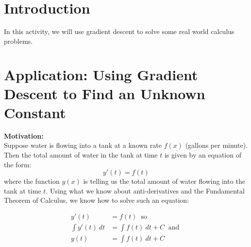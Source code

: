\documentclass[11pt]{article}
\begin{document}
\begin{minipage}[c]{0.63\textwidth}
\begin{center}
\end{center}
\end{minipage}
\newpage


















\newpage
\section*{Introduction}

In this activity, we will use gradient descent to solve some real world calculus problems.
\section*{Application: Using Gradient Descent to Find an Unknown Constant}

\textbf{Motivation:} \\
Suppose water is flowing into a tank at a known rate $f(x)$ (gallons per minute). Then the total amount of water in the tank at time $t$ is given by an equation of the form:
\[
y'(t) = f(t)
\]
where the function $y(x)$ is telling us the  total amount of water flowing into the tank at time $t$. Using what we know about anti-derivatives and the Fundamental Theorem of Calculus, we know how to solve such an equation:

\begin{align*}
y'(t) &= f(t) \ \text{ so}\\
\int y'(t) \ dt  &= \int f(t) \ dt + C \  \text{ and }\\
y(t) &= \int f(t) \ dt + C
\end{align*}
\end{document}

